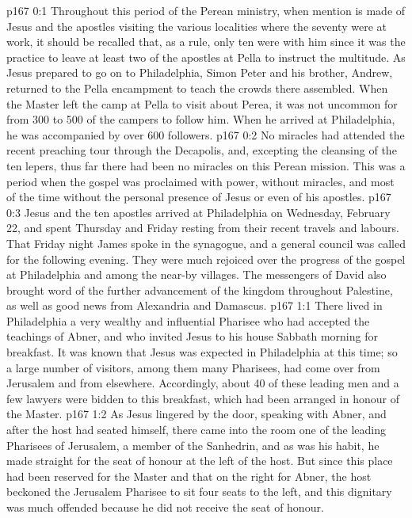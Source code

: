 \author{Midwayer Commission}
\vs p167 0:1 Throughout this period of the Perean ministry, when mention is made of Jesus and the apostles visiting the various localities where the seventy were at work, it should be recalled that, as a rule, only ten were with him since it was the practice to leave at least two of the apostles at Pella to instruct the multitude. As Jesus prepared to go on to Philadelphia, Simon Peter and his brother, Andrew, returned to the Pella encampment to teach the crowds there assembled. When the Master left the camp at Pella to visit about Perea, it was not uncommon for from 300 to 500 of the campers to follow him. When he arrived at Philadelphia, he was accompanied by over 600 followers.
\vs p167 0:2 No miracles had attended the recent preaching tour through the Decapolis, and, excepting the cleansing of the ten lepers, thus far there had been no miracles on this Perean mission. This was a period when the gospel was proclaimed with power, without miracles, and most of the time without the personal presence of Jesus or even of his apostles.
\vs p167 0:3 \pc Jesus and the ten apostles arrived at Philadelphia on Wednesday, February 22, and spent Thursday and Friday resting from their recent travels and labours. That Friday night James spoke in the synagogue, and a general council was called for the following evening. They were much rejoiced over the progress of the gospel at Philadelphia and among the near\hyp{}by villages. The messengers of David also brought word of the further advancement of the kingdom throughout Palestine, as well as good news from Alexandria and Damascus.
\vs p167 1:1 There lived in Philadelphia a very wealthy and influential Pharisee who had accepted the teachings of Abner, and who invited Jesus to his house Sabbath morning for breakfast. It was known that Jesus was expected in Philadelphia at this time; so a large number of visitors, among them many Pharisees, had come over from Jerusalem and from elsewhere. Accordingly, about 40 of these leading men and a few lawyers were bidden to this breakfast, which had been arranged in honour of the Master.
\vs p167 1:2 As Jesus lingered by the door, speaking with Abner, and after the host had seated himself, there came into the room one of the leading Pharisees of Jerusalem, a member of the Sanhedrin, and as was his habit, he made straight for the seat of honour at the left of the host. But since this place had been reserved for the Master and that on the right for Abner, the host beckoned the Jerusalem Pharisee to sit four seats to the left, and this dignitary was much offended because he did not receive the seat of honour.
